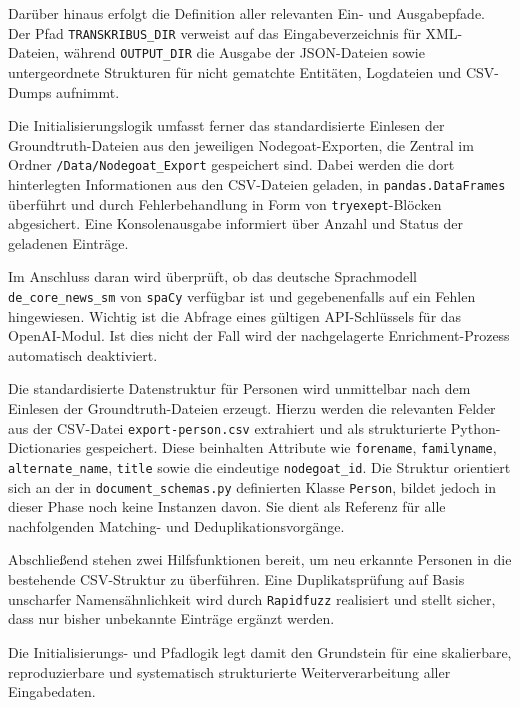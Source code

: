 \documentclass[12pt, a4paper, ngerman, bidi=default]{article}
\newcommand{\code}[1]{\colorbox{VeryLightGray}{\texttt{#1}}} %
\begin{document}
Darüber hinaus erfolgt die Definition aller relevanten Ein- und Ausgabepfade. Der 
Pfad \code{TRANSKRIBUS\_DIR} verweist auf das Eingabeverzeichnis für XML-Dateien, während 
\code{OUTPUT\_DIR} die Ausgabe der JSON-Dateien sowie untergeordnete Strukturen für nicht 
gematchte Entitäten, Logdateien und CSV-Dumps aufnimmt.

Die Initialisierungslogik umfasst ferner das standardisierte Einlesen der Groundtruth-Dateien aus den 
jeweiligen Nodegoat-Exporten, die Zentral im Ordner \code{/Data/Nodegoat\_Export} gespeichert sind. 
Dabei werden die dort hinterlegten Informationen aus den 
CSV-Dateien geladen, in \code{pandas.DataFrames} überführt und durch Fehlerbehandlung in Form von
\code{try\-exept}-Blöcken abgesichert. 
Eine Konsolenausgabe informiert über Anzahl und Status der geladenen Einträge.

Im Anschluss daran wird überprüft, ob das deutsche Sprachmodell 
\code{de\_core\_news\_sm} von \code{spaCy} verfügbar ist und gegebenenfalls auf ein Fehlen hingewiesen. 
Wichtig ist die Abfrage eines gültigen 
API-Schlüssels für das OpenAI-Modul. Ist dies nicht der Fall wird der nachgelagerte Enrichment-Prozess 
automatisch deaktiviert.

Die standardisierte Datenstruktur für Personen wird unmittelbar nach dem Einlesen der 
Groundtruth-Dateien erzeugt. Hierzu werden die relevanten Felder aus der CSV-Datei 
\code{export-person.csv} extrahiert und als strukturierte Python-Dictionaries gespeichert. 
Diese beinhalten Attribute wie \code{forename}, \code{familyname}, \code{alternate\_name}, 
\code{title} sowie die eindeutige \code{nodegoat\_id}. Die Struktur orientiert sich an der in 
\code{document\_schemas.py} definierten Klasse \code{Person}, bildet jedoch in dieser Phase noch 
keine Instanzen davon. Sie dient als Referenz für alle nachfolgenden Matching- und 
Deduplikationsvorgänge.


Abschließend stehen zwei Hilfsfunktionen bereit, um neu erkannte Personen in die bestehende 
CSV-Struktur zu überführen. Eine Duplikatsprüfung auf Basis unscharfer Namensähnlichkeit wird 
durch \code{Rapidfuzz} realisiert und stellt sicher, dass nur bisher unbekannte Einträge ergänzt werden.

Die Initialisierungs- und Pfadlogik legt damit den Grundstein für eine skalierbare, 
reproduzierbare und systematisch strukturierte Weiterverarbeitung aller Eingabedaten.
\end{document}
